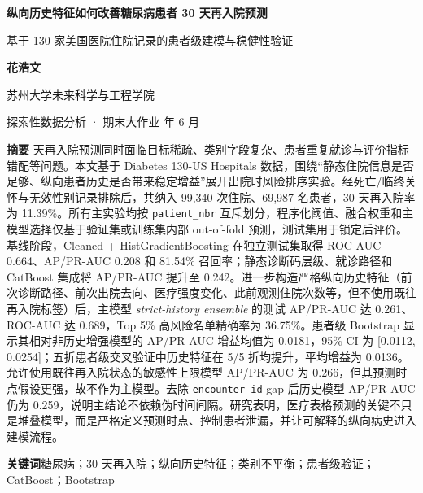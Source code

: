 \documentclass[UTF8,a4paper,11pt,fontset=none]{ctexart}
\begin{document}
\begin{center}
  {\bfseries\fontsize{19.5pt}{25pt}\selectfont 纵向历史特征如何改善糖尿病患者 30 天再入院预测\par}
  \vspace{0.45em}
  {\large 基于 130 家美国医院住院记录的患者级建模与稳健性验证\par}
  \vspace{0.9em}
  {\normalsize\bfseries 花浩文\par}
  \vspace{0.25em}
  {\normalsize 苏州大学未来科学与工程学院\par}
  \vspace{0.15em}
  {\small 探索性数据分析 · 期末大作业 年 6 月\par}
\end{center}
\vspace{0.65em}
\begin{center}
\begin{minipage}{0.92\textwidth}
\small
\noindent\textbf{摘要} 天再入院预测同时面临目标稀疏、类别字段复杂、患者重复就诊与评价指标错配等问题。本文基于 Diabetes 130-US Hospitals 数据，围绕“静态住院信息是否足够、纵向患者历史是否带来稳定增益”展开出院时风险排序实验。经死亡/临终关怀与无效性别记录排除后，共纳入 99,340 次住院、69,987 名患者，30 天再入院率为 11.39\%。所有主实验均按 \texttt{patient\_nbr} 互斥划分，程序化阈值、融合权重和主模型选择仅基于验证集或训练集内部 out-of-fold 预测，测试集用于锁定后评价。基线阶段，Cleaned + HistGradientBoosting 在独立测试集取得 ROC-AUC 0.664、AP/PR-AUC 0.208 和 81.54\% 召回率；静态诊断码层级、就诊路径和 CatBoost 集成将 AP/PR-AUC 提升至 0.242。进一步构造严格纵向历史特征（前次诊断路径、前次出院去向、医疗强度变化、此前观测住院次数等，但不使用既往再入院标签）后，主模型 \textit{strict-history ensemble} 的测试 AP/PR-AUC 达 0.261、ROC-AUC 达 0.689，Top 5\% 高风险名单精确率为 36.75\%。患者级 Bootstrap 显示其相对非历史增强模型的 AP/PR-AUC 增益均值为 0.0181，95\% CI 为 [0.0112, 0.0254]；五折患者级交叉验证中历史特征在 5/5 折均提升，平均增益为 0.0136。允许使用既往再入院状态的敏感性上限模型 AP/PR-AUC 为 0.266，但其预测时点假设更强，故不作为主模型。去除 \texttt{encounter\_id} gap 后历史模型 AP/PR-AUC 仍为 0.259，说明主结论不依赖伪时间间隔。研究表明，医疗表格预测的关键不只是堆叠模型，而是严格定义预测时点、控制患者泄漏，并让可解释的纵向病史进入建模流程。

\vspace{0.45em}
\noindent\textbf{关键词}\quad 糖尿病；30 天再入院；纵向历史特征；类别不平衡；患者级验证；CatBoost；Bootstrap
\end{minipage}
\end{center}
\vspace{1.0em}
\end{document}
